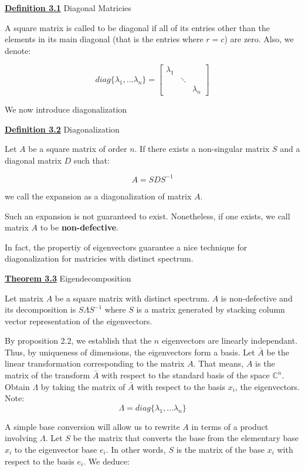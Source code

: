 \documentclass{article}
\newcommand{\new}[1]{
    \vspace{2mm}
    \noindent
    \textbf{
    \underline{#1}}
}
\begin{document}
\new{Definition 3.1} Diagonal Matricies

A square matrix is called to be diagonal if all of its entries 
other than the elements in its main diagonal (that is the 
entries where $r = c$) are zero. Also, we denote:

\[
    diag\{\lambda_1, ... \lambda_n\} 
    = 
  \begin{bmatrix}
    \lambda_1 & & \\
    & \ddots & \\
    & & \lambda_{n}
  \end{bmatrix}
\]

We now introduce diagonalization

\new{Definition 3.2} Diagonalization 

Let $A$ be a square matrix of order $n$. If there exists a 
non-singular matrix $S$ and a diagonal matrix $D$ such that:

\[
    A = SDS^{-1}
\]

we call the expansion as a diagonalization of matrix $A$. 

Such an expansion is not guaranteed to exist. Nonetheless, 
if one exists, we call matrix $A$ to be \textbf{non-defective}. 

In fact, the propertiy of eigenvectors guarantee a nice technique 
for diagonalization for matricies with distinct spectrum. 

\new{Theorem 3.3} Eigendecomposition

Let matrix $A$ be a square matrix with distinct spectrum. 
$A$ is non-defective and its decomposition is $S\Lambda S^{-1}$ 
where $S$ is a matrix generated by stacking column vector 
representation of the eigenvectors. 

\proof 
By proposition 2.2, we establish that the $n$ eigenvectors are 
linearly independant. Thus, by uniqueness of dimensions, the 
eigenvectors form a basis. Let $\bar{A}$ be the linear transformation 
corresponding to the matrix $A$. That means, $A$ is the matrix of 
the transform $\bar{A}$ with respect to the standard basis of the 
space $\mathbb{C}^n$. Obtain $\Lambda$ by taking the matrix of $\bar{A}$
with respect to the basis ${x_i}$, the eigenvectors. Note:
\[
    \Lambda = diag\{\lambda_1, ... \lambda_n\}
\]

A simple base conversion will allow us to rewrite $A$ in terms 
of a product involving $\Lambda$. Let $S$ be the matrix that 
converts the base from the elementary base ${x_i}$ to the eigenvector 
base ${e_i}$. In other words, $S$ is the matrix of the base $x_i$ 
with respect to the basis $e_i$. 
We deduce:
\end{document}
